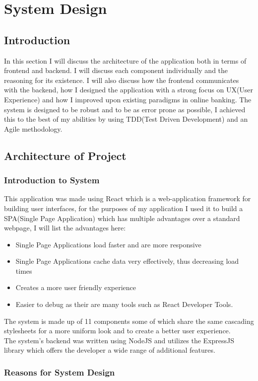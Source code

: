 \chapter{System Design}
\section{Introduction}
In this section I will discuss the architecture of the application both in terms of frontend and backend.
I will discuss each component individually and the reasoning for its existence.  I will also discuss how
the frontend communicates with the backend, how I designed the application with a strong focus on UX(User Experience)
and how I improved upon existing paradigms in online banking.  The system is designed to be robust and to be as
error prone as possible, I achieved this to the best of my abilities by using TDD(Test Driven Development) and an
Agile methodology.
\section{Architecture of Project}
\subsection{Introduction to System}
This application was made using React which is a web-application framework for building user interfaces,
for the purposes of my application I used it to build a SPA(Single Page Application) which has multiple
advantages over a standard webpage, I will list the advantages here:
\begin{itemize}
  \item Single Page Applications load faster and are more responsive
  \item Single Page Applications cache data very effectively, thus decreasing load times
  \item Creates a more user friendly experience
  \item Easier to debug as their are many tools such as React Developer Tools.
\end{itemize}
The system is made up of 11 components some of which share the same cascading stylesheets for
a more uniform look and to create a better user experience.
\\
The system's backend was written using NodeJS and utilizes the ExpressJS library
which offers the developer a wide range of additional features.
\subsection{Reasons for System Design}
